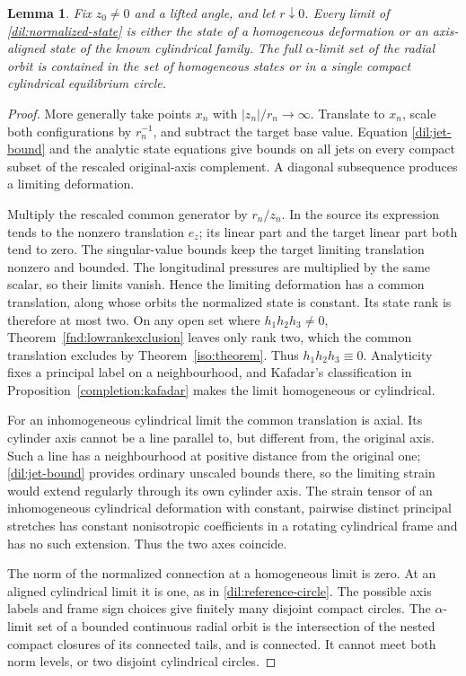 \documentclass[11pt,a4paper]{article}
\numberwithin{equation}{section}
\theoremstyle{plain}
\newtheorem{lemma}[theorem]{Lemma}
\theoremstyle{definition}
\theoremstyle{remark}
\begin{document}
\begin{lemma}\label{dil:axial-limits}
Fix $z_0\ne0$ and a lifted angle, and let $r\downarrow0$.  Every limit
of \eqref{dil:normalized-state} is either the state of a homogeneous deformation or an
axis-aligned state of the known cylindrical family.  The full
$\alpha$-limit set of the radial orbit is contained in the set of homogeneous
states or in a single compact cylindrical equilibrium circle.
\end{lemma}
\begin{proof}
More generally take points $x_n$ with $|z_n|/r_n\to\infty$.
Translate to $x_n$, scale both configurations by $r_n^{-1}$, and
subtract the target base value.  Equation \eqref{dil:jet-bound} and
the analytic state equations give bounds on all jets on every compact
subset of the rescaled original-axis complement.  A diagonal
subsequence produces a limiting deformation.  

Multiply the rescaled common generator by $r_n/z_n$.  In the source
its expression tends to the nonzero translation $e_z$; its linear
part and the target linear part both tend to zero.  The singular-value
bounds keep the target limiting translation nonzero and bounded.
The longitudinal pressures are multiplied by the same scalar, so
their limits vanish. Hence the limiting deformation has a common
translation, along whose orbits the normalized state is constant.
Its state rank is therefore at most two. On any open set where
$h_1h_2h_3\ne0$, Theorem~\ref{fnd:lowrankexclusion} leaves only rank two,
which the common translation excludes by Theorem~\ref{iso:theorem}.
Thus $h_1h_2h_3\equiv0$. Analyticity fixes a principal label on a
neighbourhood, and Kafadar's classification in
Proposition~\ref{completion:kafadar} makes the limit homogeneous
or cylindrical.

For an inhomogeneous cylindrical limit the common translation is axial.
Its cylinder axis cannot be a line parallel to, but different from,
the original axis.  Such a line has a neighbourhood at positive
distance from the original one; \eqref{dil:jet-bound} provides ordinary
unscaled bounds there, so the limiting strain would extend regularly
through its own cylinder axis.  The strain tensor of an inhomogeneous
cylindrical deformation with constant, pairwise distinct principal stretches
has constant nonisotropic coefficients in a
rotating cylindrical frame and has no such extension.  Thus the two
axes coincide.

The norm of the normalized connection at a homogeneous limit is zero.
At an aligned cylindrical limit it is one, as in
\eqref{dil:reference-circle}.
The possible axis labels and frame sign choices give finitely many
disjoint compact circles.  The $\alpha$-limit set of a bounded
continuous radial orbit is the intersection of the nested compact
closures of its connected tails, and is connected.  It cannot meet
both norm levels, or two disjoint cylindrical circles.  
\end{proof}
\end{document}
